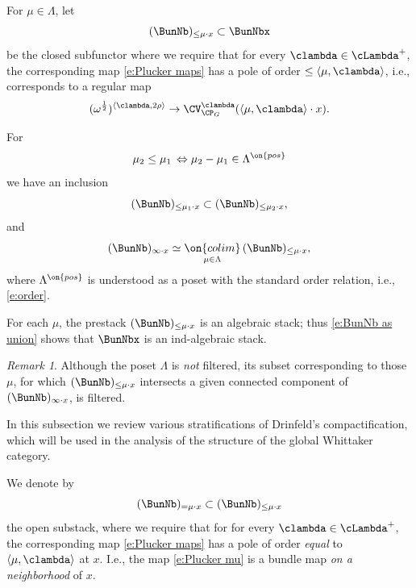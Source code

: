 \documentclass[9pt]{amsart}
\theoremstyle{definition}
\theoremstyle{remark}
\newtheorem{rem}[subsubsection]{Remark}
\numberwithin{equation}{section}
\begin{document}
\sssec{}

For $\mu\in \Lambda$, let
$$(\BunNb)_{\leq\mu\cdot x}\subset\BunNbx$$
be the closed subfunctor where we require that for every $\clambda\in \cLambda^+$, the corresponding map \eqref{e:Plucker maps}
has a pole of order $\leq \langle \mu,\clambda \rangle$, i.e., corresponds to a regular map
\begin{equation}  \label{e:Plucker mu}
(\omega^{\frac{1}{2}})^{\langle \clambda,2\rho\rangle}\to \CV^{\clambda}_{\CP_G}(\langle \mu,\clambda \rangle\cdot x). 
\end{equation}

\medskip

For 
\begin{equation} \label{e:order}
\mu_2\leq \mu_1 \, \Leftrightarrow \mu_2-\mu_1\in \Lambda^{\on{pos}} 
\end{equation} 
we have an inclusion
$$(\BunNb)_{\leq\mu_1\cdot x} \subset (\BunNb)_{\leq\mu_2\cdot x},$$
and
\begin{equation} \label{e:BunNb as union}
(\BunNb)_{\infty\cdot x}\simeq \underset{\mu\in \Lambda}{\on{colim}}\, (\BunNb)_{\leq\mu\cdot x},
\end{equation} 
where $\Lambda^{\on{pos}}$ is understood as a poset with the standard order relation, i.e., \eqref{e:order}. 

\medskip

For each $\mu$, the prestack $(\BunNb)_{\leq\mu\cdot x}$ is an algebraic stack; thus \eqref{e:BunNb as union} shows
that $\BunNbx$ is an ind-algebraic stack.

\begin{rem}
Although the poset $\Lambda$ is \emph{not} filtered, its subset corresponding to
those $\mu$, for which $(\BunNb)_{\leq\mu\cdot x}$ intersects a given connected component of $(\BunNb)_{\infty\cdot x}$, is filtered. 
\end{rem}


In this subsection we review various stratifications of Drinfeld's compactification, which will be used in the analysis 
of the structure of the global Whittaker category. 
 
\sssec{}

We denote by 
$$(\BunNb)_{=\mu\cdot x}\subset (\BunNb)_{\leq\mu\cdot x}$$
the open substack, where we require that for for every $\clambda\in \cLambda^+$, the corresponding map \eqref{e:Plucker maps}
has a pole of order \emph{equal} to $\langle \mu,\clambda \rangle$ at $x$. I.e., the map \eqref{e:Plucker mu} is a bundle map \emph{on a neighborhood}
of $x$. 
\end{document}
